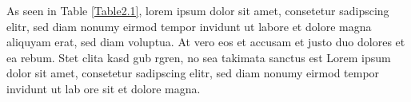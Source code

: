 
As seen in Table \ref{Table2.1}, lorem ipsum dolor sit amet, consetetur sadipscing elitr, sed diam nonumy eirmod tempor invidunt ut labore et dolore magna aliquyam erat, sed diam voluptua. At vero eos et accusam et justo duo dolores et ea rebum. Stet clita kasd gub rgren, no sea takimata sanctus est Lorem ipsum dolor sit amet, consetetur sadipscing elitr, sed diam nonumy eirmod tempor invidunt ut lab ore sit et dolore magna.


